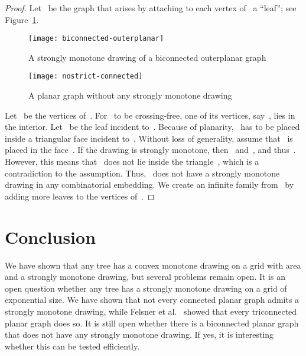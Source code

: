 \documentclass[a4paper,11pt]{article}
\theoremstyle{plain}
\begin{document}
\begin{proof}
  Let~ be the graph that arises by attaching to each vertex
  of~ a ``leaf''; see Figure~\ref{fig:nostrict-connected}.
    \begin{figure}[tb]
    \begin{minipage}[t]{.5\columnwidth}
      \centering
      \texttt{[image: biconnected-outerplanar]}
      \caption{A strongly monotone drawing of a biconnected outerplanar graph}
      \label{fig:biconnected-outerplanar}
    \end{minipage}
    \hfill
    \begin{minipage}[t]{.43\columnwidth}
      \centering
      \texttt{[image: nostrict-connected]}
      \caption{A planar graph without any strongly monotone drawing}
      \label{fig:nostrict-connected}
    \end{minipage}
  \end{figure}
  Let~ be the vertices of~. For~ to be
  crossing-free, one of its vertices, say~, lies in the interior.
  Let~ be the leaf incident to~. 
  Because of planarity,~ has to be placed inside
  a triangular face incident to~. Without loss of generality, assume
  that~ is placed in the face~. If the drawing is
  strongly monotone, 
  then~
  and~,
  and thus~.
  However, this means that~ does not lie inside the triangle~,
  which is a contradiction to the assumption. Thus,~ does not have
  a strongly monotone drawing in any combinatorial embedding.
  We create an infinite family from~ by adding more leaves to the
  vertices of~. 
\end{proof}


\section{Conclusion}
\label{sec:open}

We have shown that any tree has a convex monotone drawing on a grid with area
 and a strongly monotone drawing, but several problems remain open.
It is an open question whether any tree has a strongly monotone drawing on a grid 
of exponential size. We have shown that not every connected planar graph admits a strongly
monotone drawing, while Felsner et al.~\cite{fikkms-smdpg-socg16} showed that every
triconnected planar graph does so.
It is still open whether there is a biconnected planar 
graph that does not have any strongly monotone drawing. If yes, it is
interesting whether this can be tested efficiently. 



\end{document}
